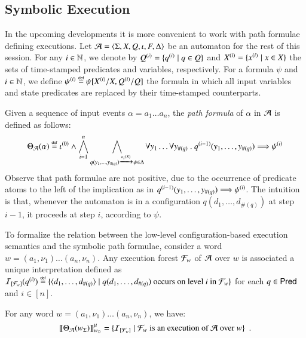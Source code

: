 \documentclass{llncs}
\begin{document}
\subsection{Symbolic Execution}

In the upcoming developments it is more convenient to work with path
formulae defining executions.  Let $\mathcal{A} =
\langle \Sigma,X,Q,\iota,F,\Delta \rangle$ be an automaton for the rest of
this session. For any $i \in {\bf \mathbb{N}}$, we denote by ${Q}^{({i})} =
\{ {q}^{({i})} \mid q \in Q \}$ and ${X}^{({i})} = \{ {x}^{({i})}
  \mid x \in X \}$ the sets of time-stamped predicates and variables,
respectively. For a formula $\psi$ and $i \in {\bf \mathbb{N}}$, we define
${\psi}^{({i})} \stackrel{\scriptscriptstyle{\mathsf{def}}}{=} \psi[{X}^{({i})}/X,{Q}^{({i})}/Q]$ the
formula in which all input variables and state predicates are replaced
by their time-stamped counterparts. 

Given a sequence of input events $\alpha = a_1 \ldots a_n$, the
\emph{path formula} of $\alpha$ in $\mathcal{A}$ is defined as follows: 
\[\Theta_{\mathcal{A}}({\alpha}) \stackrel{\scriptscriptstyle{\mathsf{def}}}{=} {\iota}^{({0})} \wedge 
\bigwedge_{i=1}^n \bigwedge_{q(y_1,\ldots,y_{\#(q)}) \xrightarrow{{\scriptscriptstyle a_i(X)}}_{{\scriptstyle }}
  \psi \in \Delta} \forall y_1 \ldots \forall y_{\#(q)} ~.~
{q}^{({i-1})}(y_1,\ldots,y_{\#(q)}) \Longrightarrow {\psi}^{({i})}\]
Observe that path formulae are not positive, due to the occurrence of
predicate atoms to the left of the implication as in
${q}^{({i-1})}(y_1,\ldots,y_{\#(q)}) \Longrightarrow
{\psi}^{({i})}$. The intuition is that, whenever the automaton is in
a configuration $q(d_1, \ldots, d_{\#(q)})$ at step $i-1$, it proceeds
at step $i$, according to $\psi$.

To formalize the relation between the low-level configuration-based
execution semantics and the symbolic path formulae, consider a word
$w=(a_1,\nu_1) \ldots (a_n,\nu_n)$. Any execution forest $\mathcal{F}_w$ of
$\mathcal{A}$ over $w$ is associated a unique interpretation defined as
$\mathcal{I}_{[\mathcal{F}_w]}({q}^{({i})}) \stackrel{\scriptscriptstyle{\mathsf{def}}}{=} \{ \langle d_1,\ldots,d_{\#(q)} \rangle
  \mid q(d_1,\ldots,d_{\#(q)}) \text{ occurs on level $i$ in $\mathcal{F}_w$} \}$
for each $q \in \mathsf{Pred}$ and $i \in [n]$. 

\begin{lemma}\label{lemma:path-formula}
  For any word $w=(a_1,\nu_1) \ldots (a_n,\nu_n)$, we have: 
  \[{\bf [\![} \Theta_{\mathcal{A}}({w_\Sigma}) {\bf ]\!]}^\mu_{w_{\mathbb{D}}} = \{ \mathcal{I}_{[\mathcal{F}_w]} \mid \mathcal{F}_w
    \text{ is an execution of $\mathcal{A}$ over $w$} \}\enspace.\]
\end{lemma}

\end{document}
